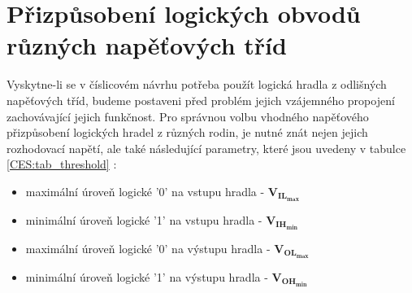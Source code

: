   \section{Přizpůsobení logických obvodů různých napěťových tříd} %
    Vyskytne-li se v číslicovém návrhu potřeba použít logická hradla z odlišných napěťových tříd,
    budeme postaveni před problém jejich vzájemného propojení zachovávající jejich funkčnost. Pro
    správnou volbu vhodného napěťového přizpůsobení logických hradel z různých rodin, je nutné znát
    nejen jejich rozhodovací napětí, ale také následující parametry, které jsou uvedeny v tabulce
    \ref{CES:tab_threshold} \cite[p.~22]{DS41285A}:
    
    \begin{itemize}[noitemsep]
      \item maximální úroveň logické '0' na vstupu hradla - $\mathbf{V_{IL_{max}}}$
      \item minimální úroveň logické '1' na vstupu hradla - $\mathbf{V_{IH_{min}}}$
      \item maximální úroveň logické '0' na výstupu hradla - $\mathbf{V_{OL_{max}}}$
      \item minimální úroveň logické '1' na výstupu hradla - $\mathbf{V_{OH_{min}}}$
    \end{itemize}
    

